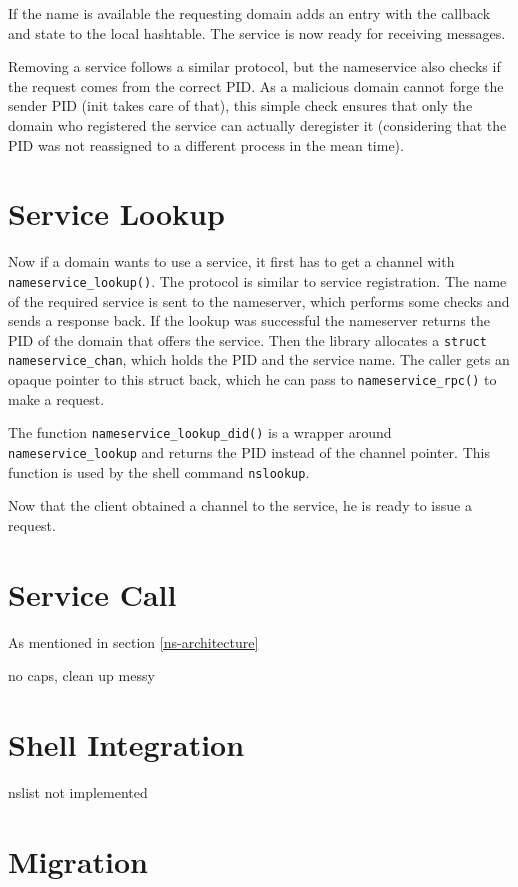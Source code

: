 If the name is available the requesting domain adds an entry with the callback and state to the local hashtable. The service is now
ready for receiving messages.

Removing a service follows a similar protocol, but the nameservice also checks if the request comes from the correct PID. As a malicious
domain cannot forge the sender PID (init takes care of that), this simple check ensures that only the domain who registered the service
can actually deregister it (considering that the PID was not reassigned to a different process in the mean time).

\section{Service Lookup}

Now if a domain wants to use a service, it first has to get a channel with \verb|nameservice_lookup()|. The protocol is similar to
service registration. The name of the required service is sent to the nameserver, which performs some checks and sends a response back.
If the lookup was successful the nameserver returns the PID of the domain that offers the service. Then the library allocates a 
\verb|struct nameservice_chan|, which holds the PID and the service name. The caller gets an opaque pointer to this struct back, which
he can pass to \verb|nameservice_rpc()| to make a request.

The function \verb|nameservice_lookup_did()| is a wrapper around \verb|nameservice_lookup| and returns the PID instead of the channel pointer.
This function is used by the shell command \verb|nslookup|.

Now that the client obtained a channel to the service, he is ready to issue a request.

\section{Service Call}
\label{ns-service-call}

As mentioned in section \ref{ns-architecture}

no caps, clean up messy



\section{Shell Integration}

nslist not implemented

\section{Migration}
